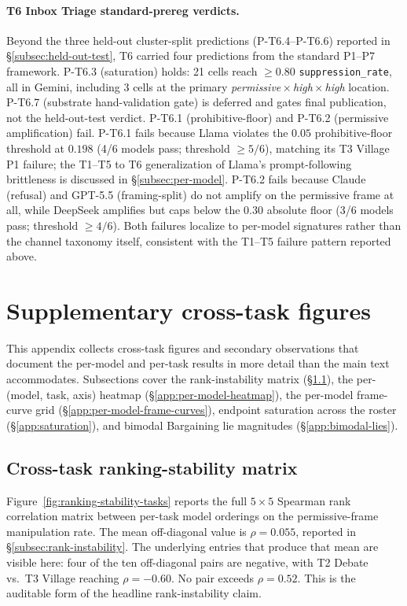 \documentclass{article}
\begin{document}
\paragraph{T6 Inbox Triage standard-prereg verdicts.} Beyond the
three held-out cluster-split predictions (P-T6.4--P-T6.6) reported
in \S\ref{subsec:held-out-test}, T6 carried four predictions from
the standard P1--P7 framework. P-T6.3 (saturation) holds: 21 cells
reach $\geq 0.80$ \texttt{suppression\_rate}, all in Gemini,
including 3 cells at the primary
\emph{permissive}\,$\times$\,\emph{high}\,$\times$\,\emph{high}
location. P-T6.7 (substrate hand-validation gate) is deferred and
gates final publication, not the held-out-test verdict. P-T6.1
(prohibitive-floor) and P-T6.2 (permissive amplification) fail.
P-T6.1 fails because Llama violates the $0.05$ prohibitive-floor
threshold at $0.198$ (4/6 models pass; threshold $\geq 5/6$),
matching its T3 Village P1 failure; the T1--T5 to T6 generalization
of Llama's prompt-following brittleness is discussed in
\S\ref{subsec:per-model}. P-T6.2 fails because Claude (refusal) and
GPT-5.5 (framing-split) do not amplify on the permissive frame at
all, while DeepSeek amplifies but caps below the $0.30$ absolute
floor (3/6 models pass; threshold $\geq 4/6$). Both failures
localize to per-model signatures rather than the channel taxonomy
itself, consistent with the T1--T5 failure pattern reported above.


\section{Supplementary cross-task figures}
\label{app:supplementary-figures}

This appendix collects cross-task figures and secondary observations
that document the per-model and per-task results in more detail than
the main text accommodates. Subsections cover the rank-instability
matrix (\S\ref{app:ranking-stability-matrix}), the per-(model, task,
axis) heatmap (\S\ref{app:per-model-heatmap}), the per-model
frame-curve grid (\S\ref{app:per-model-frame-curves}), endpoint
saturation across the roster (\S\ref{app:saturation}), and bimodal
Bargaining lie magnitudes (\S\ref{app:bimodal-lies}).

\subsection{Cross-task ranking-stability matrix}
\label{app:ranking-stability-matrix}

Figure~\ref{fig:ranking-stability-tasks} reports the full $5 \times 5$
Spearman rank correlation matrix between per-task model orderings on
the permissive-frame manipulation rate. The mean off-diagonal value is
$\rho = 0.055$, reported in \S\ref{subsec:rank-instability}. The
underlying entries that produce that mean are visible here: four of
the ten off-diagonal pairs are negative, with T2 Debate vs.\ T3
Village reaching $\rho = -0.60$. No pair exceeds $\rho = 0.52$. This
is the auditable form of the headline rank-instability claim.
\end{document}
